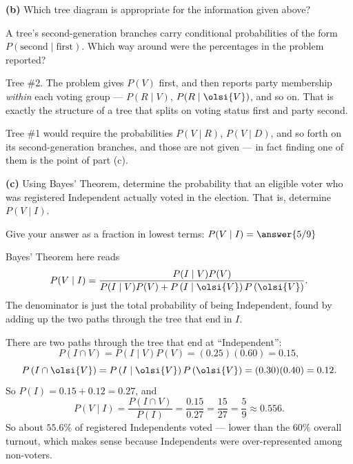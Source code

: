 \documentclass[12pt]{ximera}
\begin{document}
\begin{problem}
\begin{prompt}
\textbf{(b)} Which tree diagram is appropriate for the information given above?

\begin{multipleChoice}
\end{multipleChoice}

\begin{hint}
A tree's second-generation branches carry conditional probabilities of the form
$P(\text{second}\mid\text{first})$. Which way around were the percentages in the
problem reported?
\end{hint}

\begin{solution}
Tree \#2. The problem gives $P(V)$ first, and then reports party membership
\emph{within} each voting group --- $P(R\mid V)$, $P(R\mid\olsi{V})$, and so on.
That is exactly the structure of a tree that splits on voting status first and party
second.

Tree \#1 would require the probabilities $P(V\mid R)$, $P(V\mid D)$, and so forth on
its second-generation branches, and those are not given --- in fact finding one of
them is the point of part (c).
\end{solution}
\end{prompt}

\begin{prompt}
\textbf{(c)} Using Bayes' Theorem, determine the probability that an eligible voter
who was registered Independent actually voted in the election. That is, determine
$P(V\mid I)$.

Give your answer as a fraction in lowest terms: $P(V\mid I)=\answer{5/9}$

\begin{hint}
Bayes' Theorem here reads
\[
P(V\mid I)=\frac{P(I\mid V)P(V)}{P(I\mid V)P(V)+P\left(I\mid\olsi{V}\right)P\left(\olsi{V}\right)}.
\]
The denominator is just the total probability of being Independent, found by adding
up the two paths through the tree that end in $I$.
\end{hint}

\begin{solution}
There are two paths through the tree that end at ``Independent'':
\[
P(I\cap V)=P(I\mid V)P(V)=(0.25)(0.60)=0.15,
\]
\[
P\left(I\cap\olsi{V}\right)=P\left(I\mid\olsi{V}\right)P\left(\olsi{V}\right)=(0.30)(0.40)=0.12.
\]
So $P(I)=0.15+0.12=0.27$, and
\[
P(V\mid I)=\frac{P(I\cap V)}{P(I)}=\frac{0.15}{0.27}=\frac{15}{27}=\frac59\approx 0.556.
\]
So about $55.6\%$ of registered Independents voted --- lower than the $60\%$ overall
turnout, which makes sense because Independents were over-represented among
non-voters.
\end{solution}
\end{prompt}
\end{problem}
\end{document}
